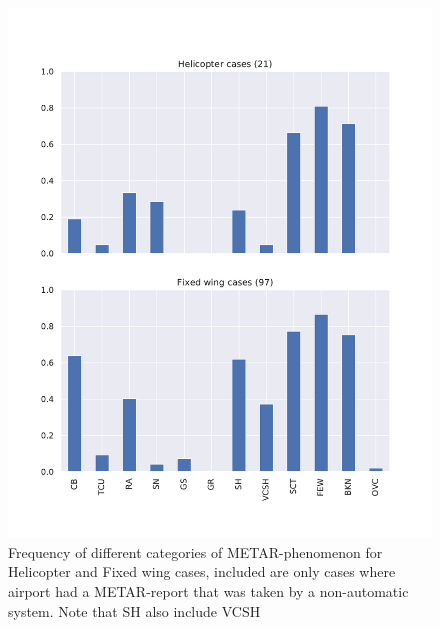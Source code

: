 \begin{figure}
    \centering
    \includegraphics[width=\textwidth]{Figures/METARcases.pdf}
    \caption{Frequency of different categories of METAR-phenomenon for Helicopter and Fixed wing cases, included are only cases where airport had a METAR-report that was taken by a non-automatic system. Note that SH also include VCSH}
    \label{fig:metarcases}
\end{figure}

